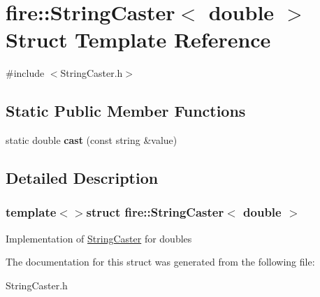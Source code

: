 \hypertarget{a00042}{}\section{fire\+:\+:String\+Caster$<$ double $>$ Struct Template Reference}
\label{a00042}


{\ttfamily \#include $<$String\+Caster.\+h$>$}

\subsection*{Static Public Member Functions}
\begin{DoxyCompactItemize}
\item 
\hypertarget{a00042_a19d0552b656a96820deb3b8db8504340}{}static double {\bfseries cast} (const string \&value)\label{a00042_a19d0552b656a96820deb3b8db8504340}

\end{DoxyCompactItemize}


\subsection{Detailed Description}
\subsubsection*{template$<$$>$struct fire\+::\+String\+Caster$<$ double $>$}

Implementation of \hyperlink{a00040}{String\+Caster} for doubles 

The documentation for this struct was generated from the following file\+:\begin{DoxyCompactItemize}
\item 
String\+Caster.\+h\end{DoxyCompactItemize}
